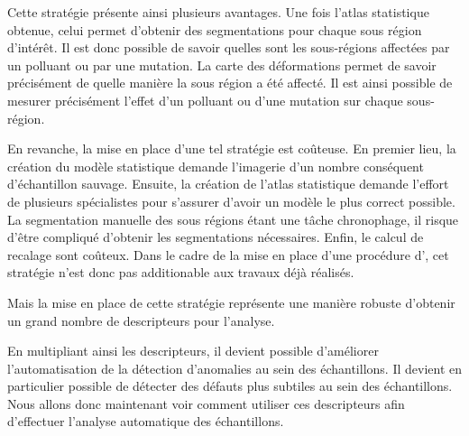 \documentclass[\main/main.tex]{subfiles}
\begin{document}
%
Cette stratégie présente ainsi plusieurs avantages.
%
Une fois l'atlas statistique obtenue, celui permet d'obtenir des segmentations pour chaque sous région d'intérêt.
%
Il est donc possible de savoir quelles sont les sous-régions affectées par un polluant ou par une mutation.
%
La carte des déformations permet de savoir précisément de quelle manière la sous région a été affecté.
%
Il est ainsi possible de mesurer précisément l'effet d'un polluant ou d'une mutation sur chaque sous-région.

%
En revanche, la mise en place d'une tel stratégie est coûteuse.
%
En premier lieu, la création du modèle statistique demande l'imagerie d'un nombre conséquent d'échantillon sauvage.
%
Ensuite, la création de l'atlas statistique demande l'effort de plusieurs spécialistes pour s'assurer d'avoir un modèle le plus correct possible.
%
La segmentation manuelle des sous régions étant une tâche chronophage,
il risque d'être compliqué d'obtenir les segmentations nécessaires.
%
Enfin, le calcul de recalage sont coûteux.
%
Dans le cadre de la mise en place d'une procédure d'\hta, cet stratégie n'est donc pas additionable aux travaux déjà réalisés.

Mais la mise en place de cette stratégie représente une manière robuste d'obtenir un grand nombre de descripteurs pour l'analyse.

En multipliant ainsi les descripteurs, il devient possible d'améliorer l'automatisation de la détection d'anomalies au sein des échantillons.
%
Il devient en particulier possible de détecter des défauts plus subtiles au sein des échantillons.
%
Nous allons donc maintenant voir comment utiliser ces descripteurs afin d'effectuer l'analyse automatique des échantillons.
\end{document}

